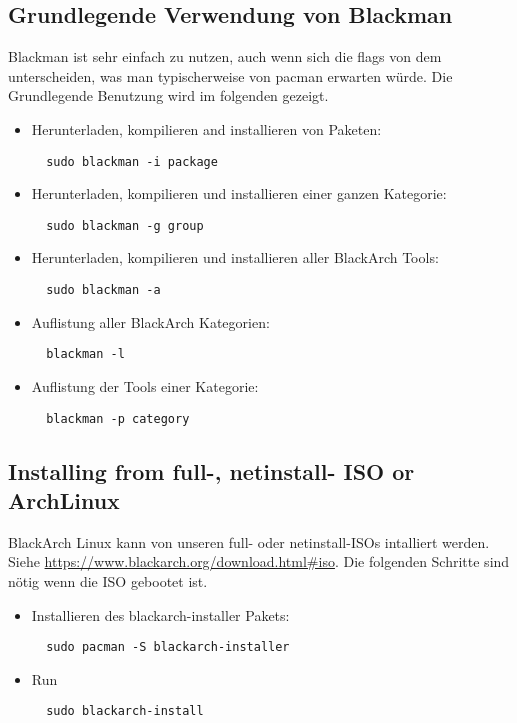 \documentclass[a4paper, oneside, 11pt]{book}
\begin{document}
\subsection{Grundlegende Verwendung von Blackman} Blackman ist sehr einfach zu nutzen, auch wenn sich die flags von dem unterscheiden, was man typischerweise von pacman erwarten würde. 
Die Grundlegende Benutzung wird im folgenden gezeigt.
\begin{itemize}
\item Herunterladen, kompilieren and installieren von Paketen:
\begin{lstlisting}
  sudo blackman -i package
\end{lstlisting}

\item Herunterladen, kompilieren und installieren einer ganzen Kategorie:
\begin{lstlisting}
  sudo blackman -g group
\end{lstlisting}

\item Herunterladen, kompilieren und installieren aller BlackArch Tools:
\begin{lstlisting}
  sudo blackman -a
\end{lstlisting}

\item Auflistung aller BlackArch Kategorien:
\begin{lstlisting}
  blackman -l
\end{lstlisting}

\item Auflistung der Tools einer Kategorie:
\begin{lstlisting}
  blackman -p category
\end{lstlisting}

\end{itemize}

\subsection{Installing from full-, netinstall- ISO or ArchLinux}
BlackArch Linux kann von unseren full- oder netinstall-ISOs intalliert werden. \\Siehe
\url{https://www.blackarch.org/download.html#iso}. Die folgenden Schritte sind nötig wenn die ISO gebootet ist.
\begin{itemize}
\item Installieren des blackarch-installer Pakets:
\begin{lstlisting}
  sudo pacman -S blackarch-installer
\end{lstlisting}

\item Run
\begin{lstlisting}
  sudo blackarch-install
\end{lstlisting}

\end{itemize}
\end{document}
